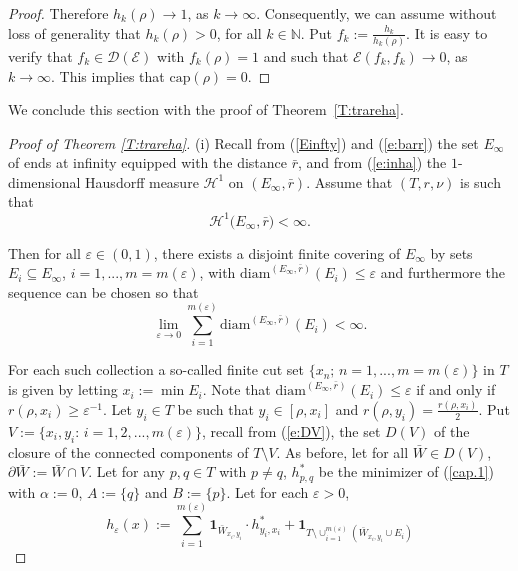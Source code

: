 \documentclass[11pt]{amsart}
\numberwithin{equation}{section}
\begin{document}
{{\begin{proof}
Therefore $h_{{k}}(\rho)\to 1$, as $k\to\infty$. Consequently, we can assume without loss of generality that $h_{k}(\rho) >0$, for all $k\in\mathbb{N}$.
Put $f_{k}:=\frac{h_{k}}{h_{k}(\rho)}$. It is easy to verify that $f_{k} \in{\mathcal D}({\mathcal E})$ with $f_{k}(\rho)=1$ and such that
$\mathcal E(f_{{k}},f_{{k}})\to 0$, as $k\to\infty$.
This implies that $\mathrm{cap}(\rho)=0$.
\end{proof}{\smallskip}}

We conclude this section with the proof of Theorem~\ref{T:trareha}.

\begin{proof}[Proof of Theorem \ref{T:trareha}] (i) Recall from (\ref{Einfty}) and (\ref{e:barr}) the set $E_\infty$ of ends at infinity equipped with the distance $\bar{r}$, and from (\ref{e:inha}) the $1$-dimensional Hausdorff measure ${\mathcal H}^1$ on $(E_\infty,\bar{r})$.
Assume that $(T,r,\nu)$ is such that
\begin{equation}
\label{e:010}
   {\mathcal H}^1\big(E_\infty,\bar{r}\big)<\infty.
\end{equation}

Then for all $\varepsilon\in(0,1)$,
there exists a disjoint finite covering of $E_\infty$ by sets $E_i\subseteq E_\infty$, $i=1,...,m=m(\varepsilon)$, with $\mathrm{diam}^{(E_\infty,\bar{r})}(E_i)\le\varepsilon$ and furthermore the sequence can be chosen so that
\begin{equation}
\label{finitelength}
   \lim_{\varepsilon\rightarrow 0}\sum_{i=1}^{m(\varepsilon)}\mathrm{diam}^{(E_\infty,\bar{r})}(E_i)<\infty.
\end{equation}

For each such collection a so-called finite {{\it} cut set} $\{x_n;\,n=1,...,m=m(\varepsilon)\}$ in $T$ is given by letting $x_i:=\min E_i$. Note that
$\mathrm{diam}^{(E_\infty,\bar{r})}(E_i)\le\varepsilon$ if and only if $r(\rho,x_i)\ge \varepsilon^{-1}$.
Let $y_{i} \in T$ be such that $y_{i}\in[\rho,x_{i}]$ and $r(\rho,y_i)=\tfrac{r(\rho,x_i)}{2}$. Put $V:=\{x_{i},y_{i}:\,i=1,2,...,m(\varepsilon)\}$, recall from (\ref{e:DV}), the set $D(V)$ of the closure of the connected components of $T\setminus V$. As before, let for all $\bar{W}\in D(V)$, $\partial \bar{W}:=\bar{W}\cap V$. Let for any $p,q\in T$ with $p\not=q$, $h^\ast_{p,q}$ be the minimizer of (\ref{cap.1}) with $\alpha:=0$, $A:=\{q\}$ and $B:=\{p\}$.
Let for each $\varepsilon>0$,
\begin{equation}
\label{e:V1}
  h_{\varepsilon}(x)
 :=
  \sum_{i=1}^{m(\varepsilon)}\mathbf{1}_{\bar{W}_{x_i,y_i}}\cdot h^{\ast}_{y_i,x_i}+\mathbf{1}_{T\setminus\cup_{i=1}^{m(\varepsilon)}(\bar{W}_{x_i,y_i}\cup E_i)}
\end{equation}


\end{proof}}
\end{document}
